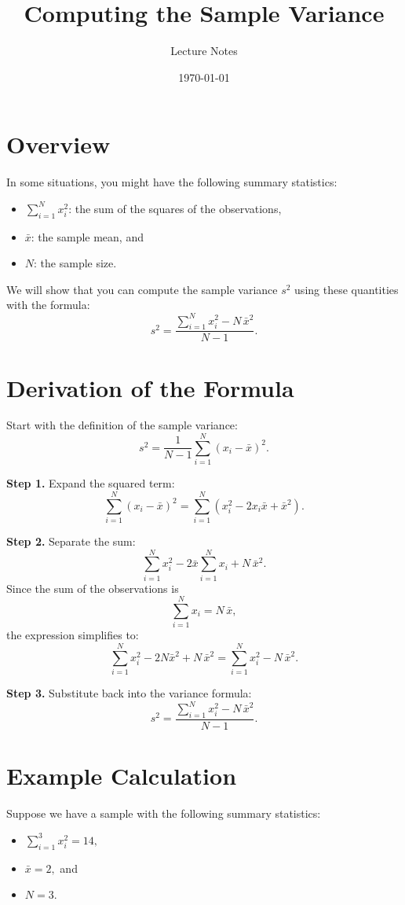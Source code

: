 \documentclass[12pt]{article}
\title{Computing the Sample Variance}
\author{Lecture Notes}
\date{\today}
\begin{document}


\section{Overview}
In some situations, you might have the following summary statistics:
\begin{itemize}
    \item \(\sum_{i=1}^{N} x_i^2\): the sum of the squares of the observations,
    \item \(\bar{x}\): the sample mean, and
    \item \(N\): the sample size.
\end{itemize}
We will show that you can compute the sample variance \(s^2\) using these quantities with the formula:
\[
s^2 = \frac{\sum_{i=1}^{N} x_i^2 - N\,\bar{x}^2}{N-1}.
\]


\section{Derivation of the Formula}
Start with the definition of the sample variance:
\[
s^2 = \frac{1}{N-1}\sum_{i=1}^{N} \left(x_i - \bar{x}\right)^2.
\]
\bigskip

\textbf{Step 1.} Expand the squared term:
\[
\sum_{i=1}^{N} \left(x_i - \bar{x}\right)^2
= \sum_{i=1}^{N} \left(x_i^2 - 2x_i\bar{x} + \bar{x}^2\right).
\]
\bigskip

\textbf{Step 2.} Separate the sum:
\[
\sum_{i=1}^{N} x_i^2 - 2\bar{x}\sum_{i=1}^{N} x_i + N\,\bar{x}^2.
\]
Since the sum of the observations is
\[
\sum_{i=1}^{N} x_i = N\,\bar{x},
\]
the expression simplifies to:
\[
\sum_{i=1}^{N} x_i^2 - 2N\bar{x}^2 + N\,\bar{x}^2
= \sum_{i=1}^{N} x_i^2 - N\,\bar{x}^2.
\]
\bigskip

\textbf{Step 3.} Substitute back into the variance formula:
\[
s^2 = \frac{\sum_{i=1}^{N} x_i^2 - N\,\bar{x}^2}{N-1}.
\]


\section{Example Calculation}
Suppose we have a sample with the following summary statistics:
\begin{itemize}
    \item \(\displaystyle \sum_{i=1}^{3} x_i^2 = 14,\)
    \item \(\bar{x} = 2,\) and
    \item \(N = 3.\)
\end{itemize}
\end{document}
